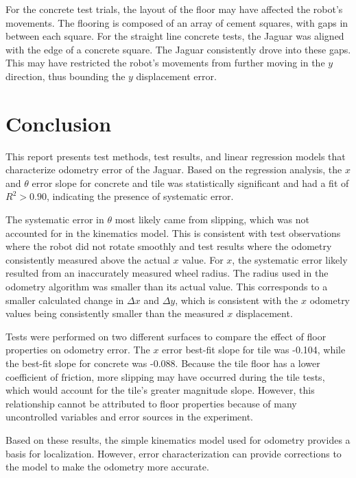 \documentclass[conference]{../IEEEtran}
\begin{document}
For the concrete test trials, the layout of the floor may have affected the
robot's movements. The flooring is composed of an array of cement squares,
with gaps in between each square. For the straight line concrete tests, the
Jaguar was aligned with the edge of a concrete square. The Jaguar consistently
drove into these gaps. This may have restricted the robot's movements from
further moving in the $y$ direction, thus bounding the $y$ displacement error.

\section{Conclusion}
This report presents test methods, test results, and linear regression models that
characterize odometry error of the Jaguar. Based on the regression analysis, the $x$ and
$\theta$ error slope for concrete and tile was statistically significant and had a fit of
$R^2>0.90$, indicating the presence of systematic error.

The systematic error in $\theta$ most likely came from slipping, which was not accounted
for in the kinematics model. This is consistent with test observations where the robot did
not rotate smoothly and test results where the odometry consistently measured above the
actual $x$ value. For $x$, the systematic error likely resulted from an inaccurately
measured wheel radius. The radius used in the odometry algorithm was smaller than its
actual value. This corresponds to a smaller calculated change in $\Delta x$ and $\Delta
y$, which is consistent with the $x$ odometry values being consistently smaller than the
measured $x$ displacement.

Tests were performed on two different surfaces to compare the effect of floor properties
on odometry error. The $x$ error best-fit slope for tile was -0.104, while the best-fit
slope for concrete was -0.088. Because the tile floor has a lower coefficient of friction,
more slipping may have occurred during the tile tests, which would account for the tile's
greater magnitude slope. However, this relationship cannot be attributed to floor
properties because of many uncontrolled variables and error sources in the experiment.

Based on these results, the simple kinematics model used for odometry provides a basis for
localization. However, error characterization can provide corrections to the model to make
the odometry more accurate.

\nocite{*}


\end{document}
